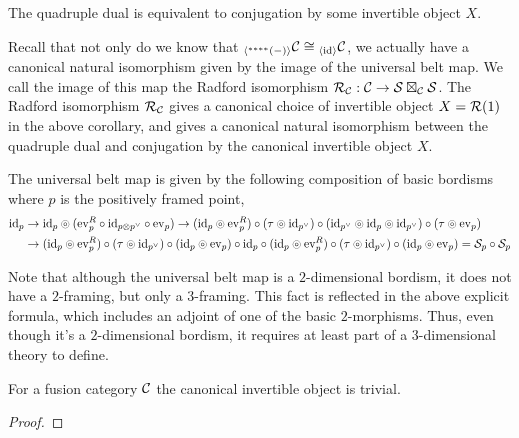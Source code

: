 \documentclass{amsart}
\begin{document}
\begin{corollary}
The quadruple dual is equivalent to conjugation by some invertible object $X$.
\end{corollary}

Recall that not only do we know that ${}_{\langle{}^{****}(-)\rangle} \mathcal C \cong {}_{\langle\mathrm{id}\rangle}\mathcal C$, we actually have a canonical natural isomorphism given by the image of the universal belt map.  We call the image of this map the Radford isomorphism $\mathcal R_\mathcal C: \mathcal C \rightarrow \mathcal S \boxtimes_\mathcal C \mathcal S$.  The Radford isomorphism $\mathcal R_\mathcal C$ gives a canonical choice of invertible object $X = \mathcal R(1)$ in the above corollary, and gives a canonical natural isomorphism between the quadruple dual and conjugation by the canonical invertible object $X$.

\begin{lemma} \label{lem:belt-formula}
The universal belt map is given by the following composition of basic bordisms where $p$ is the positively framed point,
\begin{align*} 
\mathrm{id}_p &\rightarrow \mathrm{id}_p \circledcirc (\mathrm{ev}_p^R \circ \mathrm{id}_{p \otimes p^\vee} \circ \mathrm{ev}_p)  \rightarrow (\mathrm{id}_p \circledcirc \mathrm{ev}_p^R) \circ (\tau \circledcirc \mathrm{id}_{p^\vee}) \circ (\mathrm{id}_{p^\vee} \circledcirc \mathrm{id}_p \circledcirc \mathrm{id}_{p^\vee}) \circ (\tau \circledcirc \mathrm{ev}_p) \\
&\rightarrow (\mathrm{id}_p \circledcirc \mathrm{ev}_p^R) \circ (\tau \circledcirc \mathrm{id}_{p^\vee}) \circ (\mathrm{id}_p \circledcirc \mathrm{ev}_p) \circ \mathrm{id}_p \circ (\mathrm{id}_p \circledcirc \mathrm{ev}_p^R) \circ (\tau \circledcirc \mathrm{id}_{p^\vee}) \circ (\mathrm{id}_p \circledcirc \mathrm{ev}_p) = \mathcal S_p \circ \mathcal S_p
\end{align*}  
\end{lemma}

\begin{remark}
Note that although the universal belt map is a $2$-dimensional bordism, it does not have a $2$-framing, but only a $3$-framing.  This fact is reflected in the above explicit formula, which includes an adjoint of one of the basic $2$-morphisms.  Thus, even though it's a $2$-dimensional bordism, it requires at least part of a $3$-dimensional theory to define.  
\end{remark}

\begin{theorem} 
For a fusion category $\mathcal C$ the canonical invertible object is trivial.
\end{theorem}
\begin{proof}
\end{proof}
\end{document}
